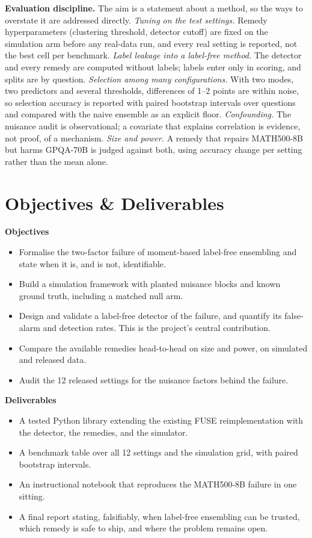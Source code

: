 \documentclass[11pt]{article}
\begin{document}
\textbf{Evaluation discipline.} The aim is a statement about a method, so the ways to
overstate it are addressed directly.
\emph{Tuning on the test settings.} Remedy hyperparameters (clustering threshold, detector
cutoff) are fixed on the simulation arm before any real-data run, and every real setting
is reported, not the best cell per benchmark.
\emph{Label leakage into a label-free method.} The detector and every remedy are computed
without labels; labels enter only in scoring, and splits are by question.
\emph{Selection among many configurations.} With two modes, two predictors and several
thresholds, differences of 1--2 points are within noise, so selection accuracy is reported
with paired bootstrap intervals over questions and compared with the naive ensemble as an
explicit floor.
\emph{Confounding.} The nuisance audit is observational; a covariate that explains
correlation is evidence, not proof, of a mechanism.
\emph{Size and power.} A remedy that repairs MATH500-8B but harms GPQA-70B is judged
against both, using accuracy change per setting rather than the mean alone.

\section*{Objectives \& Deliverables}

\textbf{Objectives}
\begin{itemize}
\item Formalise the two-factor failure of moment-based label-free ensembling and state
when it is, and is not, identifiable.
\item Build a simulation framework with planted nuisance blocks and known ground truth,
including a matched null arm.
\item Design and validate a label-free detector of the failure, and quantify its false-alarm
and detection rates. This is the project's central contribution.
\item Compare the available remedies head-to-head on size and power, on simulated and
released data.
\item Audit the 12 released settings for the nuisance factors behind the failure.
\end{itemize}

\textbf{Deliverables}
\begin{itemize}
\item A tested Python library extending the existing FUSE reimplementation with the
detector, the remedies, and the simulator.
\item A benchmark table over all 12 settings and the simulation grid, with paired
bootstrap intervals.
\item An instructional notebook that reproduces the MATH500-8B failure in one sitting.
\item A final report stating, falsifiably, when label-free ensembling can be trusted, which
remedy is safe to ship, and where the problem remains open.
\end{itemize}
\end{document}
